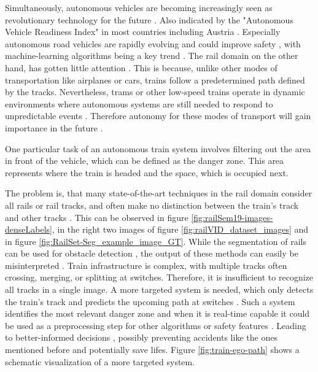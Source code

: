 Simultaneously, autonomous vehicles are becoming increasingly seen as revolutionary technology for the future \cite{FraunhoferInstituteforCognitiveSystemsIKS}.
Also indicated by the "Autonomous Vehicle Readiness Index" \cite{autonomousVehicleReadinessIndex} in most countries including Austria \cite{autonomousVehicleReadinessCounties}.
Especially autonomous road vehicles are rapidly evolving and could improve safety \cite{railsem19dataset} \cite{tepNet2024}, with machine-learning algorithms being a key trend \cite{railsem19dataset}.
The rail domain on the other hand, has gotten little attention \cite{railsem19dataset}.
This is because, unlike other modes of transportation like airplanes or cars, trains follow a predetermined path defined by the tracks.
Nevertheless, trams or other low-speed trains operate in dynamic environments where autonomous systems are still needed to respond to unpredictable events \cite{tepNet2024}.
Therefore autonomy for these modes of transport will gain importance in the future \cite{railNet2019}.

One particular task of an autonomous train system involves filtering out the area in front of the vehicle, which can be defined as the danger zone.
This area represents where the train is headed and the space, which is occupied next.

The problem is, that many state-of-the-art techniques in the rail domain consider all rails or rail tracks, and often make no distinction between the train's track and other tracks \cite{tepNet2024}.
This can be observed in figure \ref{fig:railSem19-images-denseLabels}, in the right two images of figure \ref{fig:railVID_dataset_images} and in figure \ref{fig:RailSet-Seg_example_image_GT}.
While the segmentation of rails can be used for obstacle detection \cite{railNet2019}, the output of these methods can easily be misinterpreted \cite{tepNet2024}.
Train infrastructure is complex, with multiple tracks often crossing, merging, or splitting at switches. Therefore, it is insufficient to recognize all tracks in a single image.
A more targeted system is needed, which only detects the train's track and predicts the upcoming path at switches \cite{tepNet2024}.
Such a system identifies the most relevant danger zone and when it is real-time capable it could be used as a preprocessing step for other algorithms or safety features \cite{tepNet2024} \cite{railNet2019}.
Leading to better-informed decisions \cite{tepNet2024}, possibly preventing accidents like the ones mentioned before and potentially save lifes.
Figure \ref{fig:train-ego-path} shows a schematic visualization of a more targeted system.


